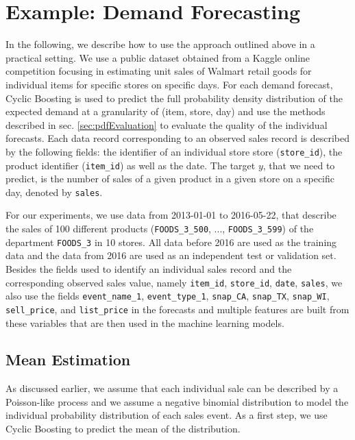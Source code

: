 \documentclass[BCOR=1mm, DIV=calc,10pt,
twoside=true,
twocolumn,
headings=normal]{scrartcl}
\begin{document}
\section{Example: Demand Forecasting}
\label{sec:example}

In the following, we describe how to use the approach outlined above in a practical setting. We use a public dataset obtained from a Kaggle online competition focusing in estimating unit sales of Walmart retail goods \cite{kaggle_data} for individual items for specific stores on specific days. For each demand forecast, Cyclic Boosting is used to predict the full probability density distribution of the expected demand at a granularity of (item, store, day) and use the methods described in sec. \ref{sec:pdfEvaluation} to evaluate the quality of the individual forecasts. Each data record corresponding to an observed sales record is described by the following fields: the identifier of an individual store store (\texttt{store\_id}), the product identifier (\texttt{item\_id}) as well as the date. The target $y$, that we need to predict, is the number of sales of a given product in a given store on a specific day, denoted by \texttt{sales}.

For our experiments, we use data from 2013-01-01 to 2016-05-22, that describe the sales of 100 different products (\texttt{FOODS\_3\_500}, ..., \texttt{FOODS\_3\_599}) of the department \texttt{FOODS\_3} in 10 stores.  All data before 2016 are used as the training data and the data from 2016 are used as an independent test or validation set. Besides the fields used to identify an individual sales record and the corresponding observed sales value, namely \texttt{item\_id}, \texttt{store\_id}, \texttt{date}, \texttt{sales}, we also use the fields \texttt{event\_name\_1}, \texttt{event\_type\_1}, \texttt{snap\_CA}, \texttt{snap\_TX}, \texttt{snap\_WI}, \texttt{sell\_price}, and \texttt{list\_price} in the forecasts and multiple features are built from these variables that are then used in the machine learning models.

\subsection{Mean Estimation}
\label{sec:example_mean}

As discussed earlier, we assume that each individual sale can be described by a Poisson-like process and we assume a negative binomial distribution to model the individual probability distribution of each sales event. As a first step, we use Cyclic Boosting to predict the mean of the distribution.
\end{document}
